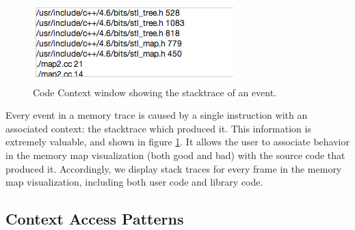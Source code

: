 \documentclass[annual]{acmsiggraph}
\begin{document}
  	\begin{figure}[t]
  		\centering
      \includegraphics[scale=0.55]{images/context.png}
  		\caption{Code Context window showing the stacktrace of an event.}
      \label{fig:context}
  	\end{figure}


    Every event in a memory trace is caused by a single instruction with an associated context: the stacktrace which produced it.
    This information is extremely valuable, and shown in figure \ref{fig:context}.
    It allows the user to associate behavior in the memory map visualization (both good and bad) 
      with the source code that produced it.
    Accordingly, we display stack traces for every frame in the memory map visualization, 
      including both user code and library code.
  
  \subsection{Context Access Patterns}
\end{document}
